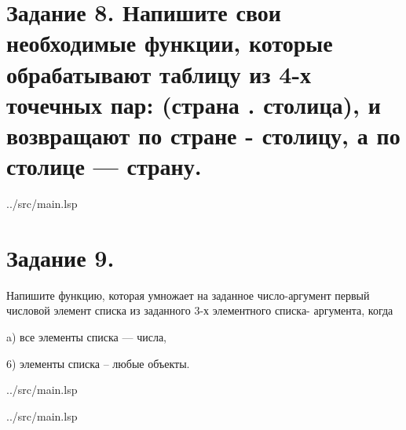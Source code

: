 \section*{Задание 8. Напишите свои необходимые функции, которые обрабатывают таблицу из 4-х точечных пар: (страна . столица), и возвращают по стране - столицу, а по столице — страну.}

\begin{lstinputlisting}[
	caption={Задание 8, IF},
	label={lst:t8},
	style={lsp},
	linerange={149-155},
	]{../src/main.lsp}
\end{lstinputlisting}

\section*{Задание 9.}
Напишите функцию, которая умножает на заданное число-аргумент 
первый числовой элемент списка из заданного 3-х элементного списка-
аргумента, когда

a) все элементы списка --- числа,

6) элементы списка -- любые объекты.


\begin{lstinputlisting}[
	caption={Задание 9, a},
	label={lst:t9-1},
	style={lsp},
	linerange={157-171},
	]{../src/main.lsp}
\end{lstinputlisting}

\begin{lstinputlisting}[
	caption={Задание 9, b},
	label={lst:t9-1},
	style={lsp},
	linerange={173-179},
	]{../src/main.lsp}
\end{lstinputlisting}





